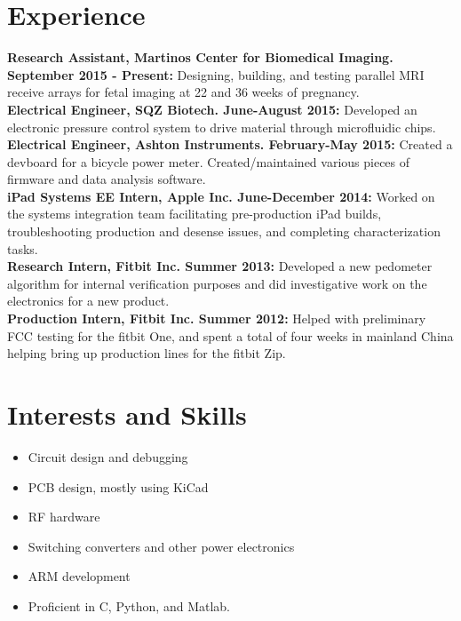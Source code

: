 \documentclass{res}
\begin{document}
\begin{resume}
\section{Experience}
	\vspace{0.05in}
	
	{\bf Research Assistant, Martinos Center for Biomedical Imaging. September 2015 - Present:} Designing, building, and testing parallel MRI receive arrays for fetal imaging at 22 and 36 weeks of pregnancy. \vspace{0.05in}\\
	{\bf Electrical Engineer, SQZ Biotech. June-August 2015:} Developed an electronic pressure control system to drive material through microfluidic chips. \vspace{0.05in}\\
	{\bf Electrical Engineer, Ashton Instruments. February-May 2015:} Created a devboard for a bicycle power meter.  Created/maintained various pieces of firmware and data analysis software. \vspace{0.05in}\\
	{\bf iPad Systems EE Intern, Apple Inc. June-December 2014:} Worked on the systems integration team facilitating pre-production iPad builds, troubleshooting production and desense issues, and completing characterization tasks.\vspace{0.05in}\\
	{\bf Research Intern, Fitbit Inc. Summer 2013:} Developed a new pedometer algorithm for internal verification purposes and did investigative work on the electronics for a new product.\vspace{0.05in}\\
	{\bf Production Intern, Fitbit Inc. Summer 2012:} Helped with preliminary FCC testing for the fitbit One, and spent a total of four weeks in mainland China helping bring up production lines for the fitbit Zip.\\
\section{Interests and Skills}
\begin{itemize}

  \item Circuit design and debugging
  \item PCB design, mostly using KiCad
  \item RF hardware
  \item Switching converters and other power electronics
  \item ARM development
  \item Proficient in C, Python, and Matlab.
\end{itemize}

\end{resume}
\end{document}
